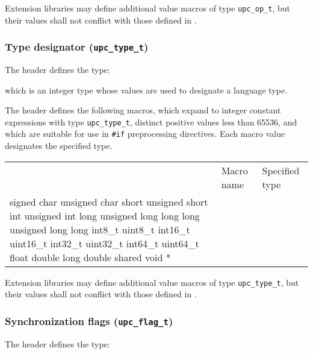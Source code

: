 \np Extension libraries may define additional value macros of type {\tt upc\_op\_t},
but their values shall not conflict with those defined in \header.

\subsubsection{Type designator ({\tt upc\_type\_t})}
\label{upc-type-t}

\npf The \header header defines the type:


which is an integer type whose values are used to designate a language type.

\np The \header header defines the following macros, 
which expand to integer constant expressions with type {\tt upc\_type\_t},
distinct positive values less than 65536, and which are suitable for use 
in {\tt \#if} preprocessing directives. 
Each macro value designates the specified type.

\begin{tabular}[b]{ p{30pt} l l }
& Macro name & Specified type\\
\cline{2-3}
{CHAR}	{signed char}
{UCHAR}	{unsigned char}
{SHORT}	{short}
{USHORT}	{unsigned short}
{INT}	{int}
{UINT}	{unsigned int}
{LONG}	{long}
{ULONG}	{unsigned long}
{LLONG}	{long long}
{ULLONG}	{unsigned long long}
{INT8}	{int8\_t}
{UINT8}	{uint8\_t}
{INT16}	{int16\_t}
{UINT16}	{uint16\_t}
{INT32}	{int32\_t}
{UINT32}	{uint32\_t}
{INT64}	{int64\_t}
{UINT64}	{uint64\_t}
{FLOAT}	{float}
{DOUBLE}	{double}
{LDOUBLE}	{long double}
{PTS}	{shared void *}
\end{tabular}

\np Extension libraries may define additional value macros of type {\tt upc\_type\_t},
but their values shall not conflict with those defined in \header.

\subsubsection{Synchronization flags ({\tt upc\_flag\_t})}
\label{upc-flag-t}

\npf The \header header defines the type:


